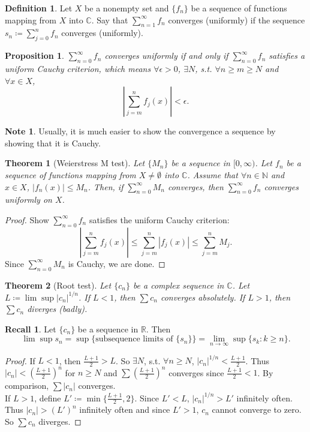 \documentclass[12pt]{article}
\theoremstyle{plain}
\newtheorem{thm}{Theorem}
\newtheorem*{prop}{Proposition}
\theoremstyle{definition}
\newtheorem*{defn}{Definition}
\newtheorem*{note}{Note}
\newtheorem*{recall}{Recall}
\begin{document}
\begin{defn}
    Let $X$ be a nonempty set and $\{f_n\}$ be a sequence of functions mapping from $X$
    into $\mathbb{C}$.
    Say that $\sum_{n=1}^\infty f_n$ converges (uniformly) if the sequence
    $s_n\coloneqq\sum_{j=0}^n f_n$ converges (uniformly).
\end{defn}

\begin{prop}
    $\sum_{n=0}^\infty f_n$ converges uniformly if and only if
    $\sum_{n=0}^\infty f_n$ satisfies a uniform Cauchy criterion, which means
    $\forall \epsilon>0$, $\exists N$, s.t. $\forall n\geq m\geq N$ and $\forall
    x\in X$, 
    $$\left|\sum_{j=m}^n f_j(x)\right|<\epsilon.$$
\end{prop}
\begin{note}
    Usually, it is much easier to show the convergence a sequence by showing
    that it is Cauchy.
\end{note}

\begin{thm}[Weierstress M test]
    Let $\{M_n\}$ be a sequence in $[0,\infty)$.
    Let $f_n$ be a sequence of functions mapping from $X\neq\emptyset$ into
    $\mathbb{C}$.
    Assume that $\forall n\in \mathbb{N}$ and $x\in X$, $|f_n(x)|\leq M_n$.
    Then, if $\sum_{n=0}^\infty M_n$ converges, then $\sum_{n=0}^\infty f_n$ converges
    uniformly on $X$.
\end{thm}
\begin{proof}
    Show $\sum_{n=0}^\infty f_n$ satisfies the uniform Cauchy criterion:
    $$\left|\sum_{j=m}^n f_j(x)\right|
    \leq \sum_{j=m}^n\left|f_j(x)\right|
    \leq\sum_{j=m}^n M_j.$$
    Since $\sum_{n=0}^\infty M_n$ is Cauchy, we are done.
\end{proof}

\begin{thm}[Root test]
    Let $\{c_n\}$ be a complex sequence in $\mathbb{C}$.
    Let $L\coloneqq \lim\sup|c_n|^{1/n}$.
    If $L<1$, then $\sum c_n$ converges absolutely.
    If $L>1$, then $\sum c_n$ diverges (badly).
\end{thm}
\begin{recall}
    Let $\{c_n\}$ be a sequence in $\mathbb{R}$.
    Then
    $$\lim\sup s_n = \sup\{\text{subsequence limits of }\{s_n\}\}
    =\lim_{n\rightarrow\infty}\sup\{s_k:k\geq n\}.$$
\end{recall}
\begin{proof}
    If $L<1$, then
    $\frac{L+1}{2}>L$.
    So $\exists N$, s.t. $\forall n\geq N$, $|c_n|^{1/n}<\frac{L+1}{2}$.
    Thus $|c_n|<\left(\frac{L+1}{2}\right)^n$ for $n\geq N$ and
    $\sum\left(\frac{L+1}{2}\right)^n$ converges since $\frac{L+1}{2}<1$.
    By comparison, $\sum|c_n|$ converges.\\
    If $L>1$, define $L'\coloneqq \min\{\frac{L+1}{2},2\}$.
    Since $L'<L$, $|c_n|^{1/n}>L'$ infinitely often.
    Thus $|c_n|>(L')^n$ infinitely often and since $L'>1$, $c_n$ cannot converge
    to zero. So $\sum c_n$ diverges.
\end{proof}
\end{document}
